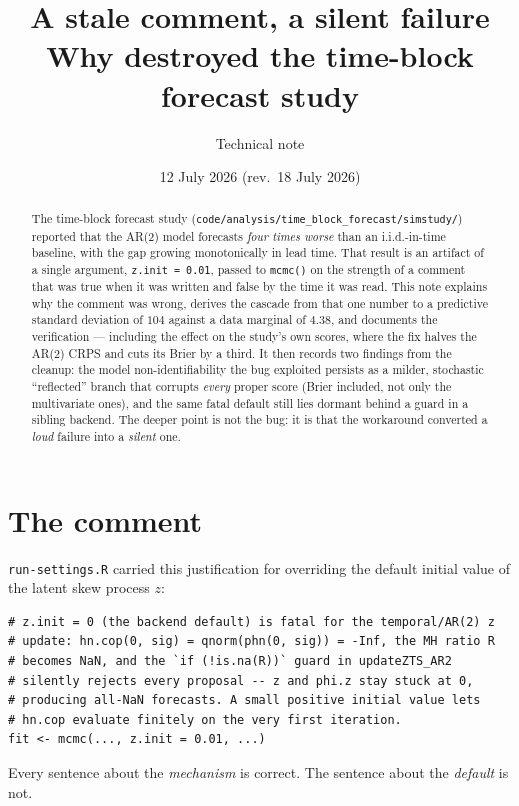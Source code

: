 \documentclass[11pt]{article}
\title{\textbf{A stale comment, a silent failure}\\[2pt]
\large Why \code{z.init = 0.01} destroyed the time-block forecast study}
\author{Technical note}
\date{12 July 2026 \quad(rev.\ 18 July 2026)}
\newcommand{\code}[1]{\texttt{#1}}
\begin{document}
\maketitle

\begin{abstract}
The time-block forecast study
(\code{code/analysis/time\_block\_forecast/simstudy/}) reported that the AR(2)
model forecasts \emph{four times worse} than an i.i.d.-in-time baseline, with
the gap growing monotonically in lead time. That result is an artifact of a
single argument, \code{z.init = 0.01}, passed to \code{mcmc()} on the strength
of a comment that was true when it was written and false by the time it was
read. This note explains why the comment was wrong, derives the cascade from
that one number to a predictive standard deviation of $104$ against a data
marginal of $4.38$, and documents the verification --- including the effect on
the study's own scores, where the fix halves the AR(2) CRPS and cuts its Brier
by a third. It then records two findings from the cleanup: the model
non-identifiability the bug exploited persists as a milder, stochastic
``reflected'' branch that corrupts \emph{every} proper score (Brier included,
not only the multivariate ones), and the same fatal default still lies dormant
behind a guard in a sibling backend. The deeper point is not the bug: it is
that the workaround converted a \emph{loud} failure into a \emph{silent} one.
\end{abstract}

\section{The comment}

\code{run-settings.R} carried this justification for overriding the default
initial value of the latent skew process $z$:

\begin{lstlisting}
# z.init = 0 (the backend default) is fatal for the temporal/AR(2) z
# update: hn.cop(0, sig) = qnorm(phn(0, sig)) = -Inf, the MH ratio R
# becomes NaN, and the `if (!is.na(R))` guard in updateZTS_AR2
# silently rejects every proposal -- z and phi.z stay stuck at 0,
# producing all-NaN forecasts. A small positive initial value lets
# hn.cop evaluate finitely on the very first iteration.
fit <- mcmc(..., z.init = 0.01, ...)
\end{lstlisting}

Every sentence about the \emph{mechanism} is correct. The sentence about the
\emph{default} is not.
\end{document}
